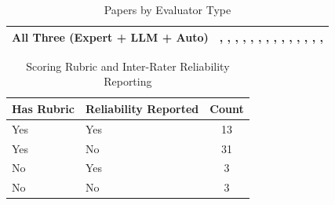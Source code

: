 \begin{table}[tbp]
\begin{tabular}{p{5cm}p{10cm}}
\midrule
All Three (Expert + LLM + Auto) & \cite{Aghakhani2025From}, \cite{Feng2025Reframe}, \cite{Kim2025Can}, \cite{Li2024Understanding}, \cite{Louie2026Can}, \cite{Nguyen2025Do}, \cite{Samuel2025PersonaGym}, \cite{Schmidgall2025AgentClinic}, \cite{Wang2024PATIENT}, \cite{Wang2025CARE-Bench}, \cite{Wang2025Psychological}, \cite{Xie2025PsyDT}, \cite{Xu2025MultiAgentESC}, \cite{Yang2025CAMI}, \cite{Yang2025Consistent} \\
\bottomrule
\end{tabular}
\caption{Papers by Evaluator Type}
\label{tab:evaluator-types-cite}
\end{table}

\begin{table}[tbp]
\centering
\small
\begin{tabular}{llc}
\toprule
\textbf{Has Rubric} & \textbf{Reliability Reported} & \textbf{Count} \\
\midrule
Yes & Yes & 13 \\
Yes & No & 31 \\
No & Yes & 3 \\
No & No & 3 \\
\bottomrule
\end{tabular}
\caption{Scoring Rubric and Inter-Rater Reliability Reporting}
\label{tab:rubric-reliability}
\end{table}

